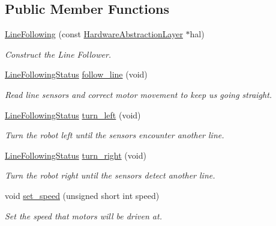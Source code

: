 \subsection*{Public Member Functions}
\begin{DoxyCompactItemize}
\item 
\hyperlink{classIDP_1_1LineFollowing_ab30cde971719545d81ce253ae995cc4d}{LineFollowing} (const \hyperlink{classIDP_1_1HardwareAbstractionLayer}{HardwareAbstractionLayer} $\ast$hal)
\begin{DoxyCompactList}\small\item\em Construct the Line Follower. \item\end{DoxyCompactList}\item 
\hyperlink{namespaceIDP_a5993bdfdd901fc5521c8df42dca43bd0}{LineFollowingStatus} \hyperlink{classIDP_1_1LineFollowing_ad26d7726d2bb263658ed3140d3e30852}{follow\_\-line} (void)
\begin{DoxyCompactList}\small\item\em Read line sensors and correct motor movement to keep us going straight. \item\end{DoxyCompactList}\item 
\hyperlink{namespaceIDP_a5993bdfdd901fc5521c8df42dca43bd0}{LineFollowingStatus} \hyperlink{classIDP_1_1LineFollowing_a551e979a503328c2f645a1af2798d940}{turn\_\-left} (void)
\begin{DoxyCompactList}\small\item\em Turn the robot left until the sensors encounter another line. \item\end{DoxyCompactList}\item 
\hyperlink{namespaceIDP_a5993bdfdd901fc5521c8df42dca43bd0}{LineFollowingStatus} \hyperlink{classIDP_1_1LineFollowing_adc0b67e4dc93dfef246cdde6190b0745}{turn\_\-right} (void)
\begin{DoxyCompactList}\small\item\em Turn the robot right until the sensors detect another line. \item\end{DoxyCompactList}\item 
void \hyperlink{classIDP_1_1LineFollowing_af034f457aef1716d042606c71dddfd73}{set\_\-speed} (unsigned short int speed)
\begin{DoxyCompactList}\small\item\em Set the speed that motors will be driven at. \item\end{DoxyCompactList}\end{DoxyCompactItemize}


